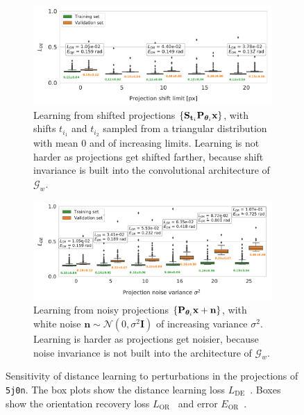 \begin{figure}[ht!]
    \centering
    \begin{subfigure}[t]{0.47\linewidth}
        \includegraphics[width=\linewidth]{figures/de_translation_nums}
        \caption{%
            Learning from shifted projections $\{ \mathbf{S}_{\mathbf{t}_i} \mathbf{P}_{{\boldsymbol{\theta}}_i} \mathbf{x} \}$, with shifts $t_{i_1}$ and $t_{i_2}$ sampled from a triangular distribution with mean 0 and of increasing limits.
            Learning is not harder as projections get shifted farther, because shift invariance is built into the convolutional architecture of $\mathcal{G}_w$.
    }\label{fig:results:distance-estimation:shift}
    \end{subfigure}
    \hfill
    \begin{subfigure}[t]{0.47\linewidth}
        \includegraphics[width=\linewidth]{figures/de_noises_nums}
        \caption{%
            Learning from noisy projections $\{ \mathbf{P}_{{\boldsymbol{\theta}}_i} \mathbf{x} + \mathbf{n} \}$, with white noise $\mathbf{n} \sim \mathcal{N}(0, \sigma^2\mathbf{I})$ of increasing variance $\sigma^2$.
            Learning is harder as projections get noisier, because noise invariance is not built into the architecture of $\mathcal{G}_w$.
        }\label{fig:results:distance-estimation:noise}
    \end{subfigure}
    \caption{%
        Sensitivity of distance learning to perturbations in the projections of \texttt{5j0n}.
        The box plots show the distance learning loss $L_\text{DE}$~.
        Boxes show the orientation recovery loss $L_\text{OR}$~ and error $E_\text{OR}$~.
    }
\end{figure}

